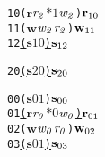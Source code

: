 \newsavebox{\boxnoone}
\begin{lrbox}{\boxnoone}
\begin{minipage}[t]{0.65\linewidth}
\large
\begin{alltt}
10 (\(\mathbf{r}\) \(\mathit{r\sb{2}}\) \(\mathit{\ast 1}\) \(\mathit{w\sb{2}}\)) \(\mathbf{r}\sb{10}\)
11 (\(\mathbf{w}\) \(\mathit{w\sb{2}}\) \(\mathit{r\sb{2}}\)) \(\mathbf{w}\sb{11}\)
12 \underline{(\(\mathbf{s}\) \(\mathit{1 0}\)) \(\mathbf{s}\sb{12}\)}
\end{alltt}
\end{minipage}
\end{lrbox}

\newsavebox{\boxnotwo}
\begin{lrbox}{\boxnotwo}
\begin{minipage}[t]{0.65\linewidth}
\large
\begin{alltt}
20 \underline{(\(\mathbf{s}\) \(\mathit{2 0}\)) \(\mathbf{s}\sb{20}\)}
\end{alltt}
\end{minipage}
\end{lrbox}


\newcommand\examplefigtwo{
\begin{figure*}[tb]
\begin{center}
\setlength{\tabcolsep}{2pt}
\begin{tabular}[t]{c|c|c}
$\mathit{p_0}$ & $\mathit{p_1}$ & $\mathit{p_2}$ \\
\hline
\scalebox{0.8}{\usebox{\boxnozero}}&
\scalebox{0.8}{\usebox{\boxnoone}} &
\scalebox{0.8}{\usebox{\boxnotwo}}\\
\end{tabular}
\end{center}
\caption{No Deadlock Caused by Mismatched Send and Receive}
\label{fig:nodeadlock1}
\end{figure*}
}


\newsavebox{\boxone}
\begin{lrbox}{\boxone}
\begin{minipage}[t]{0.65\linewidth}
\large
\begin{alltt}
00 (\(\mathbf{s}\) \(\mathit{0 1}\)) \(\mathbf{s}\sb{00}\)
01 \underline{(\(\mathbf{r}\) \(\mathit{r\sb{0}}\) \(\mathit{\ast 0}\) \(\mathit{w\sb{0}}\)) \(\mathbf{r}\sb{01}\)}
02 (\(\mathbf{w}\) \(\mathit{w\sb{0}}\) \(\mathit{r\sb{0}}\)) \(\mathbf{w}\sb{02}\)
03 \underline{(\(\mathbf{s}\) \(\mathit{0 1}\)) \(\mathbf{s}\sb{03}\)}
\end{alltt}
\end{minipage}
\end{lrbox}

